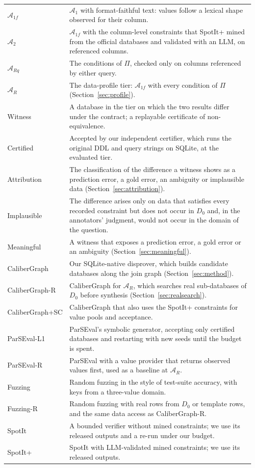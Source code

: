 \begin{table}[!htbp]
\begin{tabularx}{\linewidth}{@{}l>{\raggedright\arraybackslash}X@{}}
$\mathcal A_{1f}$ & $\mathcal A_1$ with format-faithful text: values follow a lexical shape observed for their column.\\
$\mathcal A_2$ & $\mathcal A_{1f}$ with the column-level constraints that SpotIt+ mined from the official databases and validated with an LLM, on referenced columns.\\
$\mathcal A_{Rq}$ & The conditions of $\Pi$, checked only on columns referenced by either query.\\
$\mathcal A_R$ & The data-profile tier: $\mathcal A_{1f}$ with every condition of $\Pi$ (Section~\ref{sec:profile}).\\
\midrule
Witness & A database in the tier on which the two results differ under the contract; a replayable certificate of non-equivalence.\\
Certified & Accepted by our independent certifier, which runs the original DDL and query strings on SQLite, at the evaluated tier.\\
Attribution & The classification of the difference a witness shows as a prediction error, a gold error, an ambiguity or implausible data (Section~\ref{sec:attribution}).\\
Implausible & The difference arises only on data that satisfies every recorded constraint but does not occur in $D_0$ and, in the annotators' judgment, would not occur in the domain of the question.\\
Meaningful & A witness that exposes a prediction error, a gold error or an ambiguity (Section~\ref{sec:meaningful}).\\
\midrule
CaliberGraph & Our SQLite-native disprover, which builds candidate databases along the join graph (Section~\ref{sec:method}).\\
CaliberGraph-R & CaliberGraph for $\mathcal A_R$, which searches real sub-databases of $D_0$ before synthesis (Section~\ref{sec:realsearch}).\\
CaliberGraph+SC & CaliberGraph that also uses the SpotIt+ constraints for value pools and acceptance.\\
ParSEval-L1 & ParSEval's symbolic generator, accepting only certified databases and restarting with new seeds until the budget is spent.\\
ParSEval-R & ParSEval with a value provider that returns observed values first, used as a baseline at $\mathcal A_R$.\\
Fuzzing & Random fuzzing in the style of test-suite accuracy, with keys from a three-value domain.\\
Fuzzing-R & Random fuzzing with real rows from $D_0$ or template rows, and the same data access as CaliberGraph-R.\\
SpotIt & A bounded verifier without mined constraints; we use its released outputs and a re-run under our budget.\\
SpotIt+ & SpotIt with LLM-validated mined constraints; we use its released outputs.\\
\bottomrule
\end{tabularx}
\end{table}

